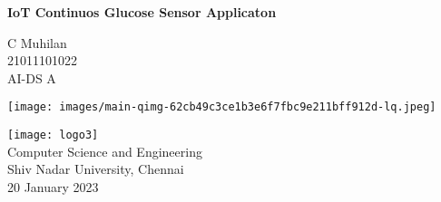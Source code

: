 \begin{titlepage}
    \centering
        \vspace*{2cm}
        \Huge
        \textbf{IoT Continuos Glucose Sensor Applicaton}
        
        \vspace*{0.6cm}
        \Large
        \textit{}
        
        \normalsize
        \vspace*{1.5cm}
        C Muhilan\\
        \vspace{0.2cm}
        21011101022\\
        \vspace{0.2cm}
        AI-DS A\\
        
        \vfill      
        
        
        \texttt{[image: images/main-qimg-62cb49c3ce1b3e6f7fbc9e211bff912d-lq.jpeg]}\\
        
        \vfill
        
        
        \texttt{[image: logo3]}\\
        Computer Science and Engineering\\
        Shiv Nadar University, Chennai\\
        20 January 2023
        \vspace*{1cm}
    
\end{titlepage}
